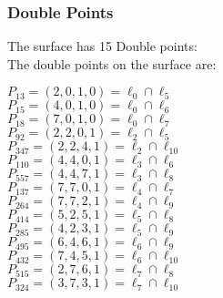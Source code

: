 \documentclass{article}
\begin{document}
{\subsubsection*{Double Points}
The surface has 15 Double points:\\
The double points on the surface are:\\
\begin{multicols}{2}
\noindent
$P_{13} = ( 2, 0, 1, 0 ) = \ell_{0} \cap \ell_{5} $\\
$P_{15} = ( 4, 0, 1, 0 ) = \ell_{0} \cap \ell_{6} $\\
$P_{18} = ( 7, 0, 1, 0 ) = \ell_{0} \cap \ell_{7} $\\
$P_{92} = ( 2, 2, 0, 1 ) = \ell_{2} \cap \ell_{5} $\\
$P_{347} = ( 2, 2, 4, 1 ) = \ell_{2} \cap \ell_{10} $\\
$P_{110} = ( 4, 4, 0, 1 ) = \ell_{3} \cap \ell_{6} $\\
$P_{557} = ( 4, 4, 7, 1 ) = \ell_{3} \cap \ell_{8} $\\
$P_{137} = ( 7, 7, 0, 1 ) = \ell_{4} \cap \ell_{7} $\\
$P_{264} = ( 7, 7, 2, 1 ) = \ell_{4} \cap \ell_{9} $\\
$P_{414} = ( 5, 2, 5, 1 ) = \ell_{5} \cap \ell_{8} $\\
$P_{285} = ( 4, 2, 3, 1 ) = \ell_{5} \cap \ell_{9} $\\
$P_{495} = ( 6, 4, 6, 1 ) = \ell_{6} \cap \ell_{9} $\\
$P_{432} = ( 7, 4, 5, 1 ) = \ell_{6} \cap \ell_{10} $\\
$P_{515} = ( 2, 7, 6, 1 ) = \ell_{7} \cap \ell_{8} $\\
$P_{324} = ( 3, 7, 3, 1 ) = \ell_{7} \cap \ell_{10} $\\
\end{multicols}
}
\end{document}
